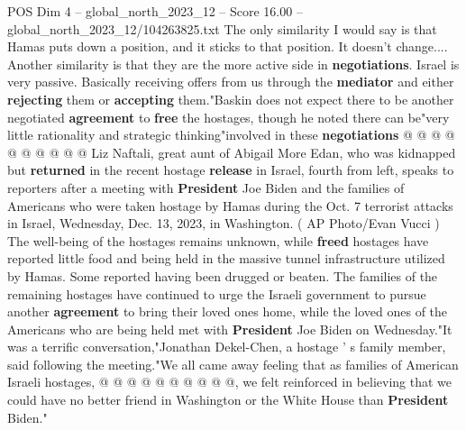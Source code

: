 \begin{textsample}{POS Dim 4 – global\_north\_2023\_12 – Score 16.00 – global\_north\_2023\_12/104263825.txt}
The only similarity I would say is that Hamas puts down a position, and it sticks to that position.
It doesn't change....
Another similarity is that they are the more active side in \textbf{negotiations}.
Israel is very passive.
Basically receiving offers from us through the \textbf{mediator} and either \textbf{rejecting} them or \textbf{accepting} them."Baskin does not expect there to be another negotiated \textbf{agreement} to \textbf{free} the hostages, though he noted there can be"very little rationality and strategic thinking"involved in these \textbf{negotiations} @ @ @ @ @ @ @ @ @ @ Liz Naftali, great aunt of Abigail More Edan, who was kidnapped but \textbf{returned} in the recent hostage \textbf{release} in Israel, fourth from left, speaks to reporters after a meeting with \textbf{President} Joe Biden and the families of Americans who were taken hostage by Hamas during the Oct. 7 terrorist attacks in Israel, Wednesday, Dec. 13, 2023, in Washington. ( AP Photo/Evan Vucci ) The well-being of the hostages remains unknown, while \textbf{freed} hostages have reported little food and being held in the massive tunnel infrastructure utilized by Hamas.
Some reported having been drugged or beaten.
The families of the remaining hostages have continued to urge the Israeli government to pursue another \textbf{agreement} to bring their loved ones home, while the loved ones of the Americans who are being held met with \textbf{President} Joe Biden on Wednesday."It was a terrific conversation,"Jonathan Dekel-Chen, a hostage ' s family member, said following the meeting."We all came away feeling that as families of American Israeli hostages, @ @ @ @ @ @ @ @ @ @, we felt reinforced in believing that we could have no better friend in Washington or the White House than \textbf{President} Biden."

\end{textsample}
